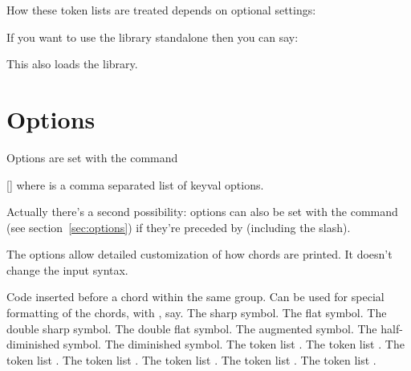\documentclass[load-preamble+]{cnltx-doc}
\begin{document}
How these token lists are treated depends on optional settings:

\begin{example}
   
   
\end{example}

If you want to use the library standalone then you can say:
\begin{sourcecode}
  \usepackage[minimal]{leadsheets}
\end{sourcecode}
This also loads the \musicsymbols{} library.

\section{Options}

Options are set with the command
\begin{commands}
  []
    where  is a comma separated list of keyval options.
\end{commands}
Actually there's a second possibility: options can also be set with the
command  (see section~\ref{sec:options}) if they're preceded
by  (including the slash).

The options allow detailed customization of how chords are printed.  It
doesn't change the input syntax.

\begin{options}
  \Default
    Code inserted before a chord within the same group. Can be used for
    special formatting of the chords, with , say.
    The sharp symbol.
    The flat symbol.
    The double sharp symbol.
    The double flat symbol.
  \Default{+}
    The augmented symbol.
    The half-diminished symbol.
    The diminished symbol.
    The token list .
    The token list .
    The token list .
  \Default
    The token list .
    The token list .
    The token list .
    The token list .
\end{options}
\end{document}
